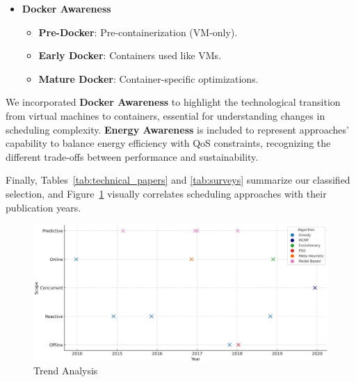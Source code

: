 \begin{multicols}{2}
\begin{itemize}
  \item \textbf{Docker Awareness}
    \begin{itemize}
      \item \textbf{Pre-Docker}: Pre-containerization (VM-only).
      \item \textbf{Early Docker}: Containers used like VMs.
      \item \textbf{Mature Docker}: Container-specific optimizations.
    \end{itemize}
\end{itemize}

We incorporated \textbf{Docker Awareness} to highlight the technological transition from virtual machines to containers, essential for understanding changes in scheduling complexity. \textbf{Energy Awareness} is included to represent approaches' capability to balance energy efficiency with QoS constraints, recognizing the different trade-offs between performance and sustainability.

Finally, Tables~\ref{tab:technical_papers} and \ref{tab:surveys} summarize our classified selection, and Figure~\ref{fig:trend_analysis} visually correlates scheduling approaches with their publication years.

\begin{figure}[H]
    \centering
    \includegraphics[width=\linewidth]{Trend_Analysis.jpeg}
    \caption{Trend Analysis}
    \label{fig:trend_analysis}
\end{figure}

\end{multicols}

